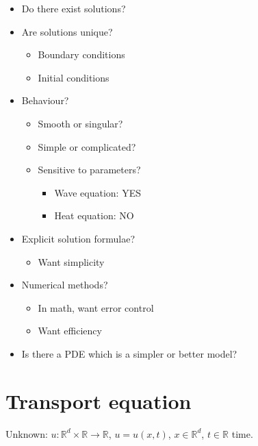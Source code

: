 \documentclass[12pt]{article}
\theoremstyle{definition}
\begin{document}
\begin{itemize}
\item Do there exist solutions?

\item Are solutions unique?

\begin{itemize}
\item Boundary conditions

\item Initial conditions
\end{itemize}

\item Behaviour?

\begin{itemize}
\item Smooth or singular?

\item Simple or complicated?

\item Sensitive to parameters?

\begin{itemize}
\item Wave equation: YES

\item Heat equation: NO
\end{itemize}
\end{itemize}

\item Explicit solution formulae?

\begin{itemize}
\item Want simplicity
\end{itemize}

\item Numerical methods?

\begin{itemize}
\item In math, want error control

\item Want efficiency
\end{itemize}

\item Is there a PDE which is a simpler or better model?
\end{itemize}

\renewcommand{\theHsection}{introduction.\thesection}
\renewcommand{\thesection}{\arabic{section}}
\setcounter{section}{0}
\section{Transport equation}\label{transport_eq}
Unknown: $u:\mathbb R^d\times\mathbb R\rightarrow\mathbb R$, $u=u(x,t)$, $x\in\mathbb R^d$, $t\in\mathbb R$ time.
\end{document}

